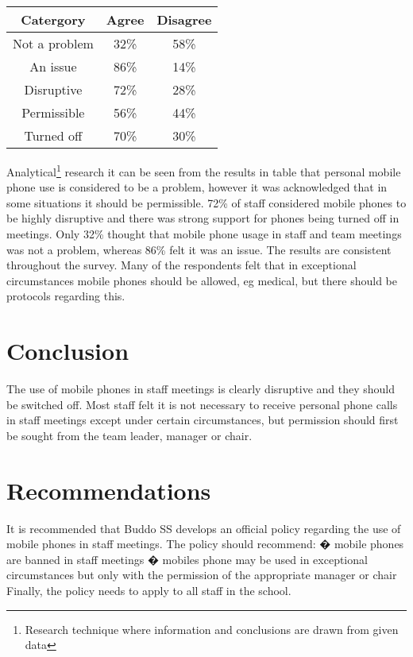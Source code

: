 \documentclass[11pt]{article}
\begin{document}
\begin{center}
\begin{tabular}{|c|c|c|}
\hline
Catergory & Agree & Disagree \\ [0.5ex]
\hline
Not a problem & 32\% & 58\% \\ [0.5ex]
\hline
An issue & 86\% & 14\% \\ [0.5ex]
\hline
Disruptive & 72\% & 28\% \\ [0.5ex]
\hline
Permissible & 56\% & 44\% \\ [0.5ex]
\hline
Turned off & 70\% & 30\% \\ [0.5ex]
\hline
\end{tabular}
\end{center}
Analytical\footnote{Research technique where information and conclusions are drawn from given data} research it can be seen from the results in table that personal mobile phone use is considered to be a problem, however it was acknowledged that in some situations it should be permissible. 72\% of staff considered mobile phones to be highly disruptive and there was strong support for phones being turned off in meetings. Only 32\% thought that mobile phone usage in staff and team meetings was not a problem, whereas 86\% felt it was an issue. The results are consistent throughout the survey. Many of the respondents felt that in exceptional circumstances mobile phones should be allowed, eg medical, but there should be protocols regarding this.
\section{Conclusion} 
The use of mobile phones in staff meetings is clearly disruptive and they should be switched off. Most staff felt it is not necessary to receive personal phone calls in staff meetings except under certain circumstances, but permission should first be sought from the team leader, manager or chair. \section{Recommendations} It is recommended that Buddo SS develops an official policy regarding the use of mobile phones in staff meetings. The policy should recommend: � mobile phones are banned in staff meetings � mobiles phone may be used in exceptional circumstances but only with the permission of the appropriate manager or chair Finally, the policy needs to apply to all staff in the school. 
\end{document}
